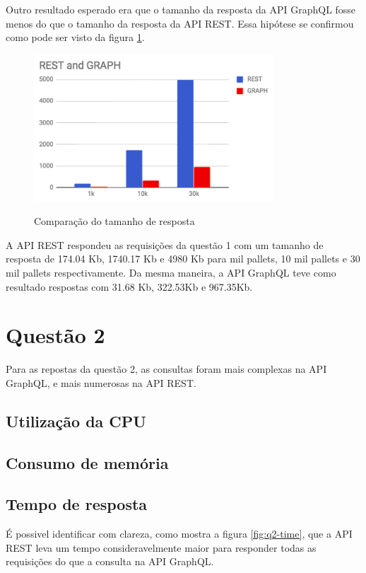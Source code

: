 Outro resultado esperado era que o tamanho da resposta da API GraphQL fosse menos do que o tamanho da resposta da API REST. Essa hipótese se confirmou como pode ser visto da figura \ref{fig:q1-size}.

\begin{figure}[htbp]
    \centering
    \includegraphics[width=0.8\textwidth]{figuras/Q1-size.png}
    \label{fig:q1-size}
    \caption{Comparação do tamanho de resposta}
    \author{fonte: Autor}
\end{figure}

A API REST respondeu as requisições da questão 1 com um tamanho de resposta de 174.04 Kb, 1740.17 Kb e 4980 Kb para mil pallets, 10 mil pallets e 30 mil pallets respectivamente. Da mesma maneira, a API GraphQL teve como resultado respostas com 31.68 Kb, 322.53Kb e 967.35Kb. 

\section{Questão 2}

Para as repostas da questão 2, as consultas foram mais complexas na API GraphQL, e mais numerosas na API REST. 

\subsection{Utilização da CPU}

\subsection{Consumo de memória}

\subsection{Tempo de resposta}

É possivel identificar com clareza, como mostra a figura \ref{fig:q2-time}, que a API REST leva um tempo consideravelmente maior para responder todas as requisições do que a consulta na API GraphQL.

